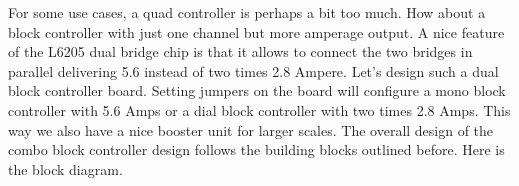 

For some use cases, a quad controller is perhaps a bit too much. How about a block controller with just one channel but more amperage output. A nice feature of the L6205 dual bridge chip is that it allows to connect the two bridges in parallel delivering 5.6 instead of two times 2.8 Ampere. Let's design such a dual block controller board. Setting jumpers on the board will configure a mono block controller with 5.6 Amps or a dial block controller with two times 2.8 Amps. This way we also have a nice booster unit for larger scales. The overall design of the combo block controller design follows the building blocks outlined before. Here is the block diagram.









